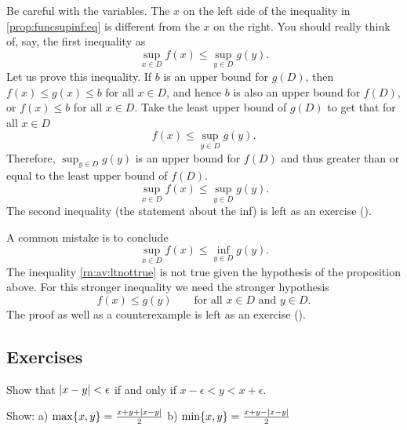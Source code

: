 Be careful with the variables.  The $x$ on the left side of
the inequality in \eqref{prop:funcsupinf:eq}
is different from the $x$ on the right.  You
should really think of, say, the first inequality as
\begin{equation*}
\sup_{x \in D} f(x) \leq \sup_{y \in D} g(y) .
\end{equation*}
Let us prove this inequality.  If $b$ is an upper bound for $g(D)$, then
$f(x) \leq g(x) \leq b$ for all $x \in D$, and hence $b$ is also an upper
bound for $f(D)$,
or $f(x) \leq b$ for all $x \in D$.
Take the least upper bound of $g(D)$ to get that for all $x \in D$
\begin{equation*}
f(x) \leq \sup_{y \in D} g(y) .
\end{equation*}
Therefore,
$\sup_{y \in D} g(y)$ is an upper bound for $f(D)$ and thus greater than or
equal to the least upper bound of $f(D)$.
\begin{equation*}
\sup_{x \in D} f(x) \leq \sup_{y \in D} g(y) .
\end{equation*}
The second inequality (the statement about the inf) is left as an exercise
().

\medskip

A common mistake is to conclude 
\begin{equation} \label{rn:av:ltnottrue}
\sup_{x \in D} f(x) \leq \inf_{y \in D} g(y) .
\end{equation}
The inequality \eqref{rn:av:ltnottrue} is not true given the hypothesis of
the proposition above.  For this stronger
inequality we need the stronger hypothesis
\begin{equation*}
f(x) \leq g(y) \qquad \text{for all } x \in D \text{ and } y \in D.
\end{equation*}
The proof as well as a counterexample is left as an exercise
().

\subsection{Exercises}

\begin{exercise}
Show that
$\left\lvert {x-y} \right\rvert < \epsilon$ if and only if $x-\epsilon < y < x+\epsilon$.
\end{exercise}

\begin{exercise}
Show: \qquad
a)
$\max \{x,y\} = \frac{x+y+\left\lvert {x-y} \right\rvert}{2}$
\qquad
b)
$\min \{x,y\} = \frac{x+y-\left\lvert {x-y} \right\rvert}{2}$
\end{exercise}

